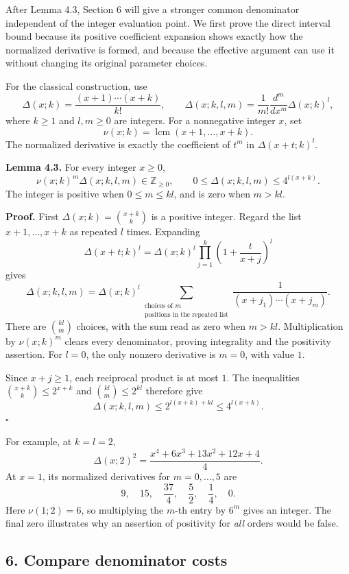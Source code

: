 \documentclass[
  11pt,
  a4paper,
]{article}
\begin{document}
After Lemma 4.3, Section 6 will give a stronger common denominator
independent of the integer evaluation point. We first prove the direct
interval bound because its positive coefficient expansion shows exactly
how the normalized derivative is formed, and because the effective
argument can use it without changing its original parameter choices.

For the classical construction, use \[
\Delta(x;k)=\frac{(x+1)\cdots(x+k)}{k!},\qquad
\Delta(x;k,l,m)=\frac1{m!}\frac{d^m}{dx^m}\Delta(x;k)^l, \tag{4.7}
\] where \(k\ge1\) and \(l,m\ge0\) are integers. For a nonnegative
integer \(x\), set \[
\nu(x;k)=\operatorname{lcm}(x+1,\ldots,x+k).
\] The normalized derivative is exactly the coefficient of \(t^m\) in
\(\Delta(x+t;k)^l\).

\textbf{Lemma 4.3.} For every integer \(x\ge0\), \[
\nu(x;k)^m\Delta(x;k,l,m)\in\mathbb Z_{\ge0},\qquad
0\le\Delta(x;k,l,m)\le4^{l(x+k)}. \tag{4.8}
\] The integer is positive when \(0\le m\le kl\), and is zero when
\(m>kl\).

\textbf{Proof.} First \(\Delta(x;k)=\binom{x+k}{k}\) is a positive
integer. Regard the list \(x+1,\ldots,x+k\) as repeated \(l\) times.
Expanding \[
\Delta(x+t;k)^l
=\Delta(x;k)^l\prod_{j=1}^k\left(1+\frac{t}{x+j}\right)^l
\] gives \[
\Delta(x;k,l,m)=\Delta(x;k)^l
\sum_{\substack{\text{choices of }m\\\text{positions in the repeated list}}}
\frac1{(x+j_1)\cdots(x+j_m)}. \tag{4.9}
\] There are \(\binom{kl}{m}\) choices, with the sum read as zero when
\(m>kl\). Multiplication by \(\nu(x;k)^m\) clears every denominator,
proving integrality and the positivity assertion. For \(l=0\), the only
nonzero derivative is \(m=0\), with value \(1\).

Since \(x+j\ge1\), each reciprocal product is at most \(1\). The
inequalities \(\binom{x+k}{k}\le2^{x+k}\) and \(\binom{kl}{m}\le2^{kl}\)
therefore give \[
\Delta(x;k,l,m)\le2^{l(x+k)+kl}\le4^{l(x+k)}.
\] \(\square\)

For example, at \(k=l=2\), \[
\Delta(x;2)^2=\frac{x^4+6x^3+13x^2+12x+4}{4}.
\] At \(x=1\), its normalized derivatives for \(m=0,\ldots,5\) are \[
9,\quad15,\quad\frac{37}{4},\quad\frac52,\quad\frac14,\quad0.
\] Here \(\nu(1;2)=6\), so multiplying the \(m\)-th entry by \(6^m\)
gives an integer. The final zero illustrates why an assertion of
positivity for \emph{all} orders would be false.

\subsection{6. Compare denominator
costs}\label{compare-denominator-costs}
\end{document}
